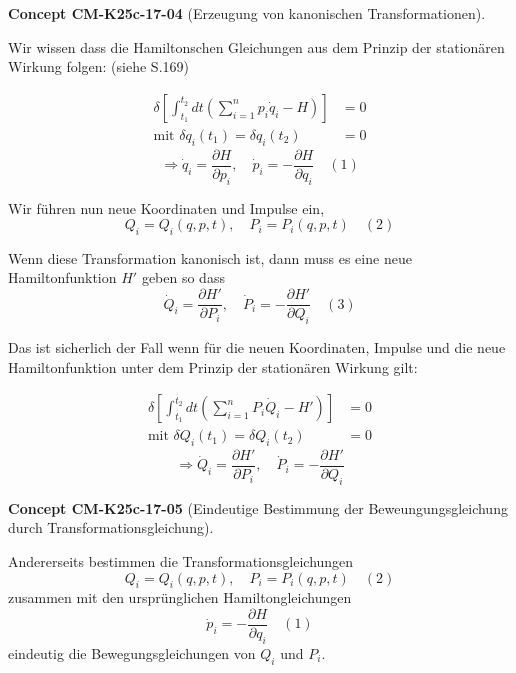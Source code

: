 \documentclass[10pt, letterpaper]{article}
\newcommand{\CustomHeading}[3]{%
  \par\medskip\noindent%
  \textbf{#1 #2} \textnormal{(#3)}.\enskip%
}
\newenvironment{CONC}[2]{\CustomHeading{Concept}{#1}{#2}}{}
\begin{document}
\begin{CONC}{CM-K25c-17-04}{Erzeugung von kanonischen Transformationen}
Wir wissen dass die Hamiltonschen Gleichungen aus dem Prinzip der stationären Wirkung folgen: (siehe S.169)

\begin{align*}
\delta \left[\int_{t_1}^{t_2} dt\left(\sum_{i=1}^n p_i\dot{q}_i - H\right)\right] &= 0\\
\text{mit } \delta q_i(t_1) = \delta q_i(t_2) &= 0
\end{align*}
\[\Rightarrow \dot{q}_i = \frac{\partial H}{\partial p_i}, \quad \dot{p}_i = -\frac{\partial H}{\partial q_i} \quad (1)\]

Wir führen nun neue Koordinaten und Impulse ein,
\[Q_i = Q_i(q,p,t), \quad P_i = P_i(q,p,t) \quad (2)\]

Wenn diese Transformation kanonisch ist, dann muss es eine neue Hamiltonfunktion $H'$ geben so dass
\[\dot{Q}_i = \frac{\partial H'}{\partial P_i}, \quad \dot{P}_i = -\frac{\partial H'}{\partial Q_i} \quad (3)\]

Das ist sicherlich der Fall wenn für die neuen Koordinaten, Impulse und die neue Hamiltonfunktion unter dem Prinzip der stationären Wirkung gilt:

\begin{align*}
\delta \left[\int_{t_1}^{t_2} dt\left(\sum_{i=1}^n P_i\dot{Q}_i - H'\right)\right] &= 0\\
\text{mit } \delta Q_i(t_1) = \delta Q_i(t_2) &= 0
\end{align*}
\[\Rightarrow \dot{Q}_i = \frac{\partial H'}{\partial P_i}, \quad \dot{P}_i = -\frac{\partial H'}{\partial Q_i}\]
\end{CONC}

\begin{CONC}{CM-K25c-17-05}{Eindeutige Bestimmung der Beweungungsgleichung durch Transformationsgleichung}
Andererseits bestimmen die Transformationsgleichungen 
\[Q_i = Q_i(q,p,t), \quad P_i = P_i(q,p,t) \quad (2)\]
zusammen mit den ursprünglichen Hamiltongleichungen 
\[ \dot{p}_i = -\frac{\partial H}{\partial q_i} \quad (1)\]
eindeutig die Bewegungsgleichungen von $Q_i$ und $P_i$.
\end{CONC}
\end{document}

